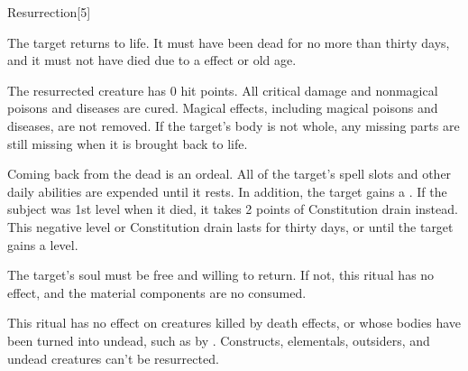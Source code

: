 \begin{spellsection}{Resurrection}[5]
    \begin{spellheader}
    \end{spellheader}
    \begin{spellcontent}
        \begin{spelltargetinginfo}
        \end{spelltargetinginfo}
        \begin{spelleffects}
            \spelleffect The target returns to life. It must have been dead for no more than thirty days, and it must not have died due to a  effect or old age.

            The resurrected creature has 0 hit points. All critical damage and nonmagical poisons and diseases are cured. Magical effects, including magical poisons and diseases, are not removed. If the target's body is not whole, any missing parts are still missing when it is brought back to life.

            \par Coming back from the dead is an ordeal. All of the target's spell slots and other daily abilities are expended until it rests. In addition, the target gains a \negativelevel. If the subject was 1st level when it died, it takes 2 points of Constitution drain instead. This negative level or Constitution drain lasts for thirty days, or until the target gains a level.
        \end{spelleffects}
    \end{spellcontent}
    \begin{spellfooter}
        \spellnotes The target's soul must be free and willing to return. If not, this ritual has no effect, and the material components are no consumed.

        This ritual has no effect on creatures killed by death effects, or whose bodies have been turned into undead, such as by . Constructs, elementals, outsiders, and undead creatures can't be resurrected.
    \end{spellfooter}
    \begin{spellaugments}
    \end{spellaugments}
\end{spellsection}


